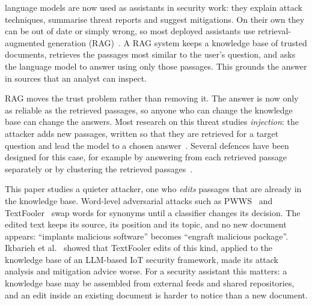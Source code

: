 \documentclass[10pt,journal,compsoc]{IEEEtran}
\begin{document}
\maketitle
\IEEEdisplaynontitleabstractindextext
\IEEEpeerreviewmaketitle

 language models are now used as assistants in security work: they explain attack techniques, summarise threat reports and suggest mitigations. On their own they can be out of date or simply wrong, so most deployed assistants use retrieval-augmented generation (RAG)~\cite{lewis2020rag}. A RAG system keeps a knowledge base of trusted documents, retrieves the passages most similar to the user's question, and asks the language model to answer using only those passages. This grounds the answer in sources that an analyst can inspect.

RAG moves the trust problem rather than removing it. The answer is now only as reliable as the retrieved passages, so anyone who can change the knowledge base can change the answers. Most research on this threat studies \emph{injection}: the attacker adds new passages, written so that they are retrieved for a target question and lead the model to a chosen answer~\cite{zou2025poisonedrag,zhong2023poisoning}. Several defences have been designed for this case, for example by answering from each retrieved passage separately or by clustering the retrieved passages~\cite{xiang2024robustrag,zhou2025trustrag}.

This paper studies a quieter attacker, one who \emph{edits} passages that are already in the knowledge base. Word-level adversarial attacks such as PWWS~\cite{ren2019pwws} and TextFooler~\cite{jin2020textfooler} swap words for synonyms until a classifier changes its decision. The edited text keeps its source, its position and its topic, and no new document appears: ``implants malicious software'' becomes ``engraft malicious package''. Ikbarieh et al.~\cite{ikbarieh2025rag} showed that TextFooler edits of this kind, applied to the knowledge base of an LLM-based IoT security framework, made its attack analysis and mitigation advice worse. For a security assistant this matters: a knowledge base may be assembled from external feeds and shared repositories, and an edit inside an existing document is harder to notice than a new document.
\end{document}
